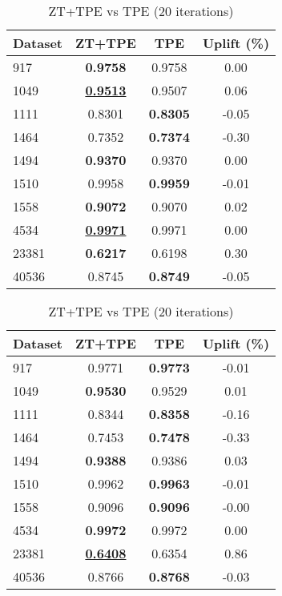 \begin{table}[htbp]
\begin{center}
\begin{small}
\begin{sc}
\begin{subtable}[t]{0.48\textwidth}
    \centering
    \caption{ZT+TPE vs TPE (10 iterations)}
    \label{tab:xgboost-optuna-10}
    \begin{tabular}{lccc}
    \toprule
    \textbf{Dataset} & \textbf{ZT+TPE} & \textbf{TPE} & \textbf{Uplift (\%)} \\
    \midrule
    917    & \textbf{0.9758} & 0.9758 & 0.00 \\
    1049    & \underline{\textbf{0.9513}} & 0.9507 & 0.06 \\
    1111    & 0.8301 & \textbf{0.8305} & -0.05 \\
    1464    & 0.7352 & \textbf{0.7374} & -0.30 \\
    1494    & \textbf{0.9370} & 0.9370 & 0.00 \\
    1510    & 0.9958 & \textbf{0.9959} & -0.01 \\
    1558    & \textbf{0.9072} & 0.9070 & 0.02 \\
    4534    & \underline{\textbf{0.9971}} & 0.9971 & 0.00 \\
    23381    & \textbf{0.6217} & 0.6198 & 0.30 \\
    40536    & 0.8745 & \textbf{0.8749} & -0.05 \\
    \bottomrule
    \end{tabular}
\end{subtable}
\hfill
\begin{subtable}[t]{0.48\textwidth}
    \centering
    \caption{ZT+TPE vs TPE (20 iterations)}
    \label{tab:xgboost-optuna-20}
    \begin{tabular}{lccc}
    \toprule
    \textbf{Dataset} & \textbf{ZT+TPE} & \textbf{TPE} & \textbf{Uplift (\%)} \\
    \midrule
    917    & 0.9771 & \textbf{0.9773} & -0.01 \\
    1049    & \textbf{0.9530} & 0.9529 & 0.01 \\
    1111    & 0.8344 & \textbf{0.8358} & -0.16 \\
    1464    & 0.7453 & \textbf{0.7478} & -0.33 \\
    1494    & \textbf{0.9388} & 0.9386 & 0.03 \\
    1510    & 0.9962 & \textbf{0.9963} & -0.01 \\
    1558    & 0.9096 & \textbf{0.9096} & -0.00 \\
    4534    & \textbf{0.9972} & 0.9972 & 0.00 \\
    23381    & \underline{\textbf{0.6408}} & 0.6354 & 0.86 \\
    40536    & 0.8766 & \textbf{0.8768} & -0.03 \\
    \bottomrule
    \end{tabular}
\end{subtable}

\end{sc}
\end{small}
\end{center}
\vskip -0.1in
\end{table}
